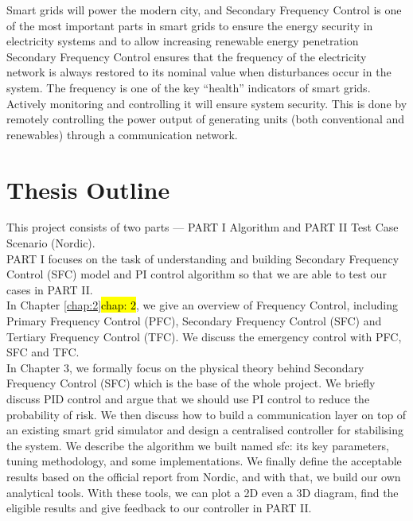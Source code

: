 \documentclass{report}
\begin{document}
Smart grids will power the modern city, and Secondary Frequency Control is one of the most important parts in smart grids to ensure the energy security in electricity systems and to allow increasing renewable energy penetration\\

Secondary Frequency Control ensures that the frequency of the electricity network is always restored to its nominal value when disturbances occur in the system. The frequency is one of the key “health” indicators of smart grids. Actively monitoring and controlling it will ensure system security. This is done by remotely controlling the power output of generating units (both conventional and renewables) through a communication network.\\


\section{Thesis Outline}
This project consists of two parts — PART I Algorithm and PART II Test Case Scenario (Nordic).\\

PART I focuses on the task of understanding and building Secondary Frequency Control (SFC) model and PI control algorithm so that we are able to test our cases in PART II.\\


In Chapter \ref{chap:2}\hl{chap: 2}, we give an overview of Frequency Control, including Primary Frequency Control (PFC), Secondary Frequency Control (SFC) and Tertiary Frequency Control (TFC). We discuss the emergency control with PFC, SFC and TFC.\\

In Chapter 3, we formally focus on the physical theory behind Secondary Frequency Control (SFC) which is the base of the whole project. We briefly discuss PID control and argue that we should use PI control to reduce the probability of risk. We then discuss how to build a communication layer on top of an existing smart grid simulator and design a centralised controller for stabilising the system. We describe the algorithm we built named sfc: its key parameters, tuning methodology, and some implementations. We finally define the acceptable results based on the official report from Nordic, and with that, we build our own analytical tools. With these tools, we can plot a 2D even a 3D diagram, find the eligible results and give feedback to our controller in PART II.\\
\end{document}
